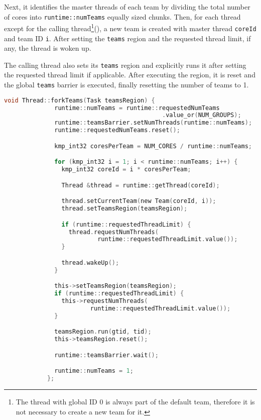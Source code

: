\begin{itemize}
          Next, it identifies the master threads of each team by dividing the total number of cores
          into \texttt{runtime::numTeams} equally sized chunks. Then, for each thread except for the
          calling thread\footnote{The thread with global ID 0 is always part of the default team,
          therefore it is not necessary to create a new team for it.}(), a new
          team is created with master thread \texttt{coreId} and team ID \texttt{i}. After setting
          the \texttt{teams} region and the requested thread limit, if any, the thread is woken up.

	      The calling thread also sets its \texttt{teams} region and explicitly runs it after
	      setting the requested thread limit if applicable. After executing the region, it is reset
	      and the global \texttt{teams} barrier is executed, finally resetting the number of teams
	      to 1.

	      \begin{lstlisting}[language=C, caption={void Thread::forkTeams},
          label={lst:thread-forkTeams},
          escapechar=@]
            void Thread::forkTeams(Task teamsRegion) {
              runtime::numTeams = runtime::requestedNumTeams
                                            .value_or(NUM_GROUPS);
              runtime::teamsBarrier.setNumThreads(runtime::numTeams);
              runtime::requestedNumTeams.reset();

              kmp_int32 coresPerTeam = NUM_CORES / runtime::numTeams;

              for (kmp_int32 i = 1; i < runtime::numTeams; i++) {
                kmp_int32 coreId = i * coresPerTeam;

                Thread &thread = runtime::getThread(coreId);

                thread.setCurrentTeam(new Team(coreId, i));
                thread.setTeamsRegion(teamsRegion);

                if (runtime::requestedThreadLimit) {
                  thread.requestNumThreads(
                          runtime::requestedThreadLimit.value());
                }

                thread.wakeUp();
              }

              this->setTeamsRegion(teamsRegion);
              if (runtime::requestedThreadLimit) {
                this->requestNumThreads(
                        runtime::requestedThreadLimit.value());
              }

              teamsRegion.run(gtid, tid);
              this->teamsRegion.reset();

              runtime::teamsBarrier.wait();

              runtime::numTeams = 1;
            };
    \end{lstlisting}

\end{itemize}

